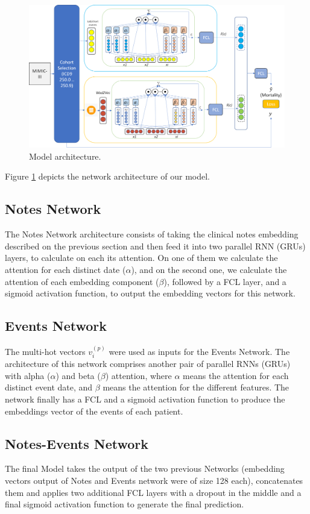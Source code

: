 \documentclass{sigkddExp}
\begin{document}
\graphicspath{ {figures/} } 
\begin{figure}\centering
\includegraphics[width=2\columnwidth]{Model.png}
\caption{Model architecture.}
\label{fig:model}
\end{figure}

Figure \ref{fig:model} depicts the network architecture of our model.

\subsection{Notes Network}

The Notes Network architecture consists of taking the clinical notes embedding 
described on the previous section and then feed it into two parallel RNN (GRUs) 
layers, to calculate on each its attention.  On one of them we calculate the 
attention for each distinct date ($\alpha$), and on the second one, we calculate the attention 
of each embedding component ($\beta$), followed by a FCL layer, and a sigmoid activation function, 
to output the embedding vectors for this network.

\subsection{Events Network}
The multi-hot vectors $\mathit v_i^{(p)}$  were used as inputs for the Events Network.  The architecture 
of this network comprises another pair of parallel RNNs (GRUs) with alpha ($\alpha$) and beta ($\beta$) attention, 
where $\alpha$ means the attention for each distinct event date, and $\beta$ means the attention for the different features. 
The network finally has a FCL and a sigmoid activation function to produce the embeddings vector of the events of each patient.


\subsection{Notes-Events Network}
The final Model takes the output of the two previous Networks (embedding vectors output of Notes and Events 
network were of size 128 each), concatenates them and applies two additional FCL layers with a dropout in the 
middle and a final sigmoid activation function to generate the final prediction.
\end{document}
